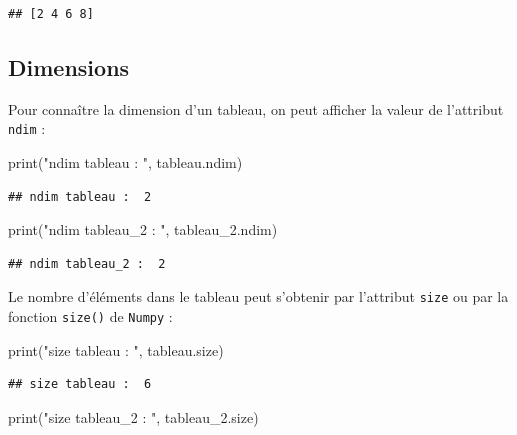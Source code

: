 \documentclass[12pt,]{book}
\newenvironment{Shaded}{\begin{snugshade}}{\end{snugshade}}
\newcommand{\StringTok}[1]{\textcolor[rgb]{0.31,0.60,0.02}{#1}}
\newcommand{\BuiltInTok}[1]{#1}
\newcommand{\NormalTok}[1]{#1}
\numberwithin{equation}{section}
\numberwithin{countremarque}{section}
\begin{document}
\begin{lstlisting}
## [2 4 6 8]
\end{lstlisting}

\subsection{Dimensions}\label{dimensions}

Pour connaître la dimension d'un tableau, on peut afficher la valeur de
l'attribut \texttt{ndim} :

\begin{Shaded}
\begin{Highlighting}[]
\BuiltInTok{print}\NormalTok{(}\StringTok{"ndim tableau : "}\NormalTok{, tableau.ndim)}
\end{Highlighting}
\end{Shaded}

\begin{lstlisting}
## ndim tableau :  2
\end{lstlisting}

\begin{Shaded}
\begin{Highlighting}[]
\BuiltInTok{print}\NormalTok{(}\StringTok{"ndim tableau_2 : "}\NormalTok{, tableau_2.ndim)}
\end{Highlighting}
\end{Shaded}

\begin{lstlisting}
## ndim tableau_2 :  2
\end{lstlisting}

Le nombre d'éléments dans le tableau peut s'obtenir par l'attribut
\texttt{size} ou par la fonction \texttt{size()} de \texttt{Numpy} :

\begin{Shaded}
\begin{Highlighting}[]
\BuiltInTok{print}\NormalTok{(}\StringTok{"size tableau : "}\NormalTok{, tableau.size)}
\end{Highlighting}
\end{Shaded}

\begin{lstlisting}
## size tableau :  6
\end{lstlisting}

\begin{Shaded}
\begin{Highlighting}[]
\BuiltInTok{print}\NormalTok{(}\StringTok{"size tableau_2 : "}\NormalTok{, tableau_2.size)}
\end{Highlighting}
\end{Shaded}
\end{document}
